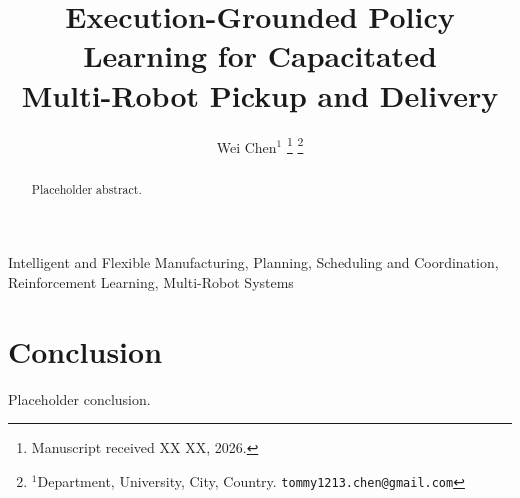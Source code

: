 \documentclass[journal]{IEEEtran}
\begin{document}
\title{Execution-Grounded Policy Learning for Capacitated\\
Multi-Robot Pickup and Delivery}

\author{%
  Wei Chen$^{1}$%
  \thanks{Manuscript received XX XX, 2026.}%
  \thanks{$^{1}$Department, University, City, Country.
    {\tt\small tommy1213.chen@gmail.com}}%
}

\maketitle

\begin{abstract}
Placeholder abstract.
\end{abstract}

\begin{IEEEkeywords}
Intelligent and Flexible Manufacturing, Planning, Scheduling and
Coordination, Reinforcement Learning, Multi-Robot Systems
\end{IEEEkeywords}






\section{Conclusion}
\label{sec:conclusion}
Placeholder conclusion.

\label{sec:architecture}
\label{sec:calibration}
\label{sec:training}
\label{sec:experiments}
\label{sec:limitations}



\end{document}
